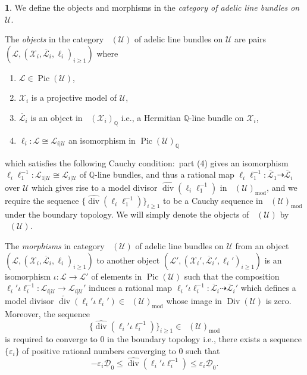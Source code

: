 \documentclass[11pt,reqno]{amsart}
\newcommand{\mQ}{\mathbb{Q}}
\newcommand{\cX}{\mathcal{X}}
\newcommand{\cD}{\mathcal{D}}
\newcommand{\cU}{\mathcal{U}}
\newcommand{\wt}[1]{\widetilde{#1}}
\newcommand{\cL}{\mathcal{L}}
\theoremstyle{theorem}
\numberwithin{equation}{subsection}
\numberwithin{equation}{subsection}
\theoremstyle{definition}
\newtheorem{definition}[subsubsection]{\text{Definition}}
\theoremstyle{remark}
\numberwithin{equation}{subsubsection} \numberwithin{figure}{section}
\DeclareMathOperator{\Pic}{Pic}
\DeclareMathOperator{\aPic}{\widehat{Pic}}
\DeclareMathOperator{\acPic}{\widehat{\underline{Pic}}}
\DeclareMathOperator{\ddiv}{div}
\DeclareMathOperator{\Div}{Div}
\DeclareMathOperator{\aDiv}{\widehat{Div}}
\newcommand{\cdef}[1]{\textsf{\textit{#1}}}
\renewcommand{\leq}{\leqslant}
\renewcommand{\geq}{\geqslant}
\DeclareMathOperator{\model}{mod}
\begin{document}
\begin{definition}
We define the objects and morphisms in the \cdef{category of adelic line bundles on $\cU$}. 

The \cdef{objects} in the {category $\acPic(\cU)$ of adelic line bundles on $\cU$} are pairs $(\cL,(\cX_i,\overline{\cL}_i,\ell_i)_{i\geq 1})$ where
\begin{enumerate}
\item $\cL \in \Pic(\cU)$,
\item $\cX_i$ is a projective model of $\cU$,
\item $\overline{\cL}_i $ is an object in $\acPic(\cX_i)_{\mQ}$ i.e., a Hermitian $\mQ$-line bundle on $\cX_i$,
\item $\ell_i\colon \cL \cong \cL_{i|\cU}$ an isomorphism in $\Pic(\cU)_{\mQ}$
\end{enumerate}
which satisfies the following Cauchy condition:~part (4) gives an isomorphism $\ell_i\ell_1^{-1}\colon \cL_{1|\cU}\cong \cL_{i|\cU}$ of $\mQ$-line bundles, and thus a rational map $\ell_i\ell_1^{-1}\colon \overline{\cL}_1 \dashrightarrow \overline{\cL}_i$ over $\cU$ which gives rise to a model divisor $\widehat{\ddiv}(\ell_i\ell_1^{-1})$ in $\aDiv(\cU)_{\model}$, and we require the sequence $\{\widehat{\ddiv}(\ell_i\ell_1^{-1})\}_{i\geq 1}$ to be a Cauchy sequence in $\aDiv(\cU)_{\model}$ under the boundary topology. We will simply denote the objects of $\acPic(\cU)$ by $\aPic(\cU)$. 

The \cdef{morphisms} in {category $\acPic(\cU)$ of adelic line bundles on $\cU$} from an object $(\cL,(\cX_i,\overline{\cL}_i,\ell_i)_{i\geq 1})$ to another object $(\cL',(\cX_i',\overline{\cL}_i',\ell_i')_{i\geq 1})$ is an isomorphism $\iota\colon \cL \to \cL'$ of elements in $\Pic(\cU)$ such that the composition $\ell_i'\iota\ell_i^{-1}\colon \cL_{i|\cU} \to \cL_{i|\cU}'$ induces a rational map $\ell_i'\iota\ell_i^{-1}\colon \overline{\cL}_i \dashrightarrow \overline{\cL}_i'$ which defines a model divisor $\wt{\ddiv}(\ell_i'\iota \ell_i') \in \aDiv(\cU)_{\model}$ whose image in $\Div(\cU)$ is zero. 
Moreover, the sequence 
\[
\{ \widehat{\ddiv}(\ell_i'\iota\ell_i^{-1})\}_{i\geq 1} \in \aDiv(\cU)_{\model}
\]
is required to converge to 0 in the boundary topology i.e., there exists a sequence $\{ \varepsilon_i\}$ of positive rational numbers converging to 0 such that 
\[
-\varepsilon_i \underline{\cD}_0 \leq \widehat{\ddiv}(\ell_i'\iota\ell_i^{-1}) \leq \varepsilon_i\underline{\cD}_0.
\]
\end{definition}
\end{document}
